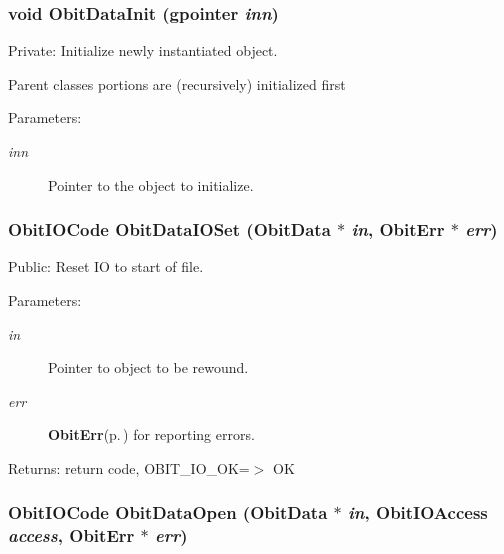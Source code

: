 \subsubsection{\setlength{\rightskip}{0pt plus 5cm}void Obit\-Data\-Init (gpointer {\em inn})}\label{ObitData_8c_a4}


Private: Initialize newly instantiated object. 

Parent classes portions are (recursively) initialized first \begin{Desc}
\item[Parameters:]
\begin{description}
\item[{\em inn}]Pointer to the object to initialize. \end{description}
\end{Desc}
\subsubsection{\setlength{\rightskip}{0pt plus 5cm}Obit\-IOCode Obit\-Data\-IOSet ({\bf Obit\-Data} $\ast$ {\em in}, {\bf Obit\-Err} $\ast$ {\em err})}\label{ObitData_8c_a25}


Public: Reset IO to start of file. 

\begin{Desc}
\item[Parameters:]
\begin{description}
\item[{\em in}]Pointer to object to be rewound. \item[{\em err}]{\bf Obit\-Err}{\rm (p.\,\pageref{structObitErr})} for reporting errors. \end{description}
\end{Desc}
\begin{Desc}
\item[Returns:]return code, OBIT\_\-IO\_\-OK=$>$ OK \end{Desc}
\subsubsection{\setlength{\rightskip}{0pt plus 5cm}Obit\-IOCode Obit\-Data\-Open ({\bf Obit\-Data} $\ast$ {\em in}, Obit\-IOAccess {\em access}, {\bf Obit\-Err} $\ast$ {\em err})}\label{ObitData_8c_a16}


